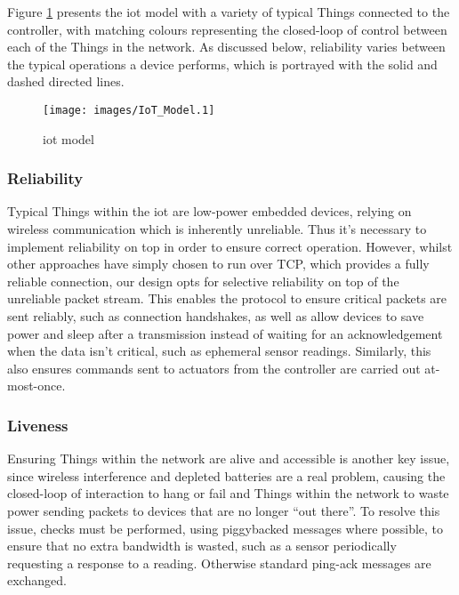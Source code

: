 \documentclass[conference]{./sty/IEEEtran}
\begin{document}
Figure \ref{fig:model} presents the iot model with a variety of typical Things connected to the controller, with matching colours representing the closed-loop of control between each of the Things in the network. As discussed below, reliability varies between the typical operations a device performs, which is portrayed with the solid and dashed directed lines.

\begin{figure}[ht!]
\begin{center}
  \texttt{[image: images/IoT\_Model.1]}
\caption{iot model}
\label{fig:model}
\end{center}
\end{figure}

\subsubsection*{Reliability} %
\label{ssub:reliability}
Typical Things within the iot are low-power embedded devices, relying on wireless communication which is inherently unreliable. Thus it's necessary to implement reliability on top in order to ensure correct operation. However, whilst other approaches have simply chosen to run over TCP, which provides a fully reliable connection, our design opts for selective reliability on top of the unreliable packet stream. This enables the protocol to ensure critical packets are sent reliably, such as connection handshakes, as well as allow devices to save power and sleep after a transmission instead of waiting for an acknowledgement when the data isn't critical, such as ephemeral sensor readings. Similarly, this also ensures commands sent to actuators from the controller are carried out at-most-once.

\subsubsection*{Liveness} %
\label{ssub:liveness}
Ensuring Things within the network are alive and accessible is another key issue, since wireless interference and depleted batteries are a real problem, causing the closed-loop of interaction to hang or fail and Things within the network to waste power sending packets to devices that are no longer ``out there''. To resolve this issue, checks must be performed, using piggybacked messages where possible, to ensure that no extra bandwidth is wasted, such as a sensor periodically requesting a response to a reading. Otherwise standard ping-ack messages are exchanged.
\end{document}
